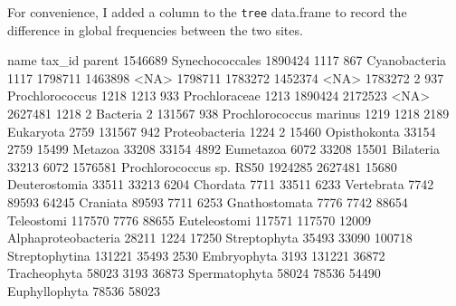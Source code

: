 \documentclass{article}
\begin{document}
For convenience, I added a column to the {\tt tree} data.frame to record the difference in global frequencies between the two sites.
\begin{Schunk}
\begin{Soutput}
                                               name  tax_id  parent
1546689                             Synechococcales 1890424    1117
867                                   Cyanobacteria    1117 1798711
1463898                                        <NA> 1798711 1783272
1452374                                        <NA> 1783272       2
937                                 Prochlorococcus    1218    1213
933                                   Prochloraceae    1213 1890424
2172523                                        <NA> 2627481    1218
2                                          Bacteria       2  131567
938                         Prochlorococcus marinus    1219    1218
2189                                      Eukaryota    2759  131567
942                                  Proteobacteria    1224       2
15460                                  Opisthokonta   33154    2759
15499                                       Metazoa   33208   33154
4892                                      Eumetazoa    6072   33208
15501                                     Bilateria   33213    6072
1576581                    Prochlorococcus sp. RS50 1924285 2627481
15680                                 Deuterostomia   33511   33213
6204                                       Chordata    7711   33511
6233                                     Vertebrata    7742   89593
64245                                      Craniata   89593    7711
6253                                  Gnathostomata    7776    7742
88654                                    Teleostomi  117570    7776
88655                                  Euteleostomi  117571  117570
12009                           Alphaproteobacteria   28211    1224
17250                                  Streptophyta   35493   33090
100718                               Streptophytina  131221   35493
2530                                    Embryophyta    3193  131221
36872                                  Tracheophyta   58023    3193
36873                                 Spermatophyta   58024   78536
54490                                 Euphyllophyta   78536   58023

\end{Soutput}
\end{Schunk}
\end{document}
